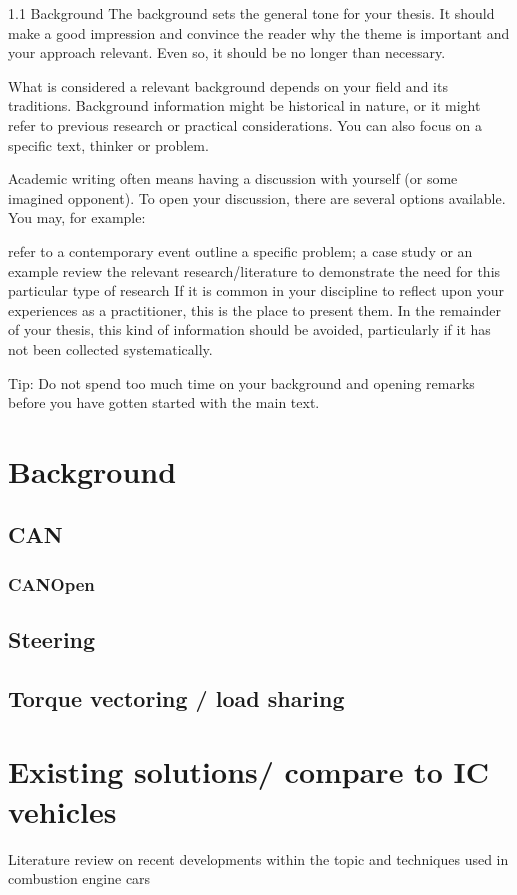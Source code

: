
1.1 Background
The background sets the general tone for your thesis. It should make a good impression and convince the reader why the theme is important and your approach relevant. Even so, it should be no longer than necessary.

What is considered a relevant background depends on your field and its traditions. Background information might be historical in nature, or it might refer to previous research or practical considerations. You can also focus on a specific text, thinker or problem.

Academic writing often means having a discussion with yourself (or some imagined opponent). To open your discussion, there are several options available. You may, for example:

refer to a contemporary event
outline a specific problem; a case study or an example
review the relevant research/literature to demonstrate the need for this particular type of research
If it is common in your discipline to reflect upon your experiences as a practitioner, this is the place to present them. In the remainder of your thesis, this kind of information should be avoided, particularly if it has not been collected systematically.

Tip: Do not spend too much time on your background and opening remarks before you have gotten started with the main text.

\chapter{Background}
\section{CAN}
\subsection{CANOpen}
\section{Steering}
\section{Torque vectoring / load sharing}

\chapter{Existing solutions/ compare to IC vehicles}
Literature review on recent developments within the topic and techniques used in combustion engine cars